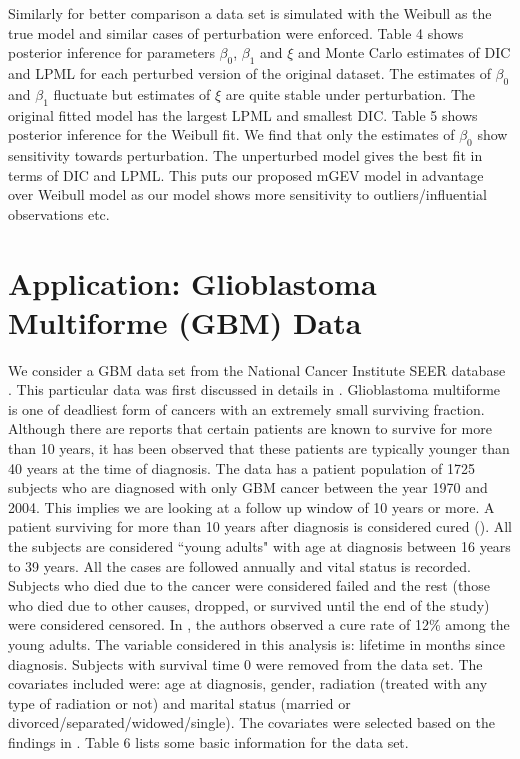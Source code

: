 \documentclass[smallextended]{svjour3}       %
\begin{document}
{Similarly for better comparison a data set is simulated with the Weibull as the true model and similar cases of perturbation were enforced. Table 4 shows posterior inference for parameters $\beta_0$, $\beta_1$ and $\xi$ and Monte Carlo estimates of DIC and LPML for each perturbed version of the original dataset. The estimates of $\beta_0$ and $\beta_1$ fluctuate but estimates of $\xi$ are quite stable under perturbation. The original fitted model has the largest LPML and smallest DIC. Table 5 shows posterior inference for the Weibull fit. We find that only the estimates of $\beta_0$ show sensitivity towards perturbation. The unperturbed model gives the best fit in terms of DIC and LPML. This puts our proposed mGEV model in advantage over Weibull model as our model shows more sensitivity to outliers/influential observations etc.




\section{Application: Glioblastoma Multiforme (GBM) Data}
We consider a GBM data set from the National Cancer Institute SEER database \citet*{seer:database:2013}. This particular data was first discussed in details in \citet{smoll:2012}. Glioblastoma multiforme is one of deadliest form of cancers with an extremely small surviving fraction. Although there are reports that certain patients are known to survive for more than 10 years, it has been observed that these patients are typically younger than 40 years at the time of diagnosis. The data has a patient population of 1725 subjects who are diagnosed with only GBM cancer between the year 1970 and 2004. This implies we are looking at a follow up window of 10 years or more. A patient surviving for more than 10 years after diagnosis is considered cured (\citet{smoll:2012}). All the subjects are considered ``young adults" with age at diagnosis between 16 years to 39 years.  All the cases are followed annually and vital status is recorded. Subjects who died due to the cancer were considered failed and the rest (those who died due to other causes, dropped, or survived until the end of the study) were considered censored. In \citet{smoll:2012}, the authors observed a cure rate of 12\% among the young adults. The variable considered in this analysis is: lifetime in months since diagnosis. Subjects with survival time 0 were removed from the data set. The covariates included were: age at diagnosis, gender, radiation (treated with any type of radiation or not) and marital status (married or divorced/separated/widowed/single). The covariates were selected based on the findings in \citet{smoll:2012}. Table 6 lists some basic information for the data set.



}
\end{document}
